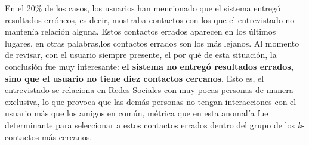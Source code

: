 En el 20\% de los casos, los usuarios han mencionado que el sistema entregó resultados erróneos, es decir, mostraba contactos con los que el entrevistado no mantenía relación alguna. Estos contactos errados aparecen en los últimos lugares, en otras palabras,los contactos errados son los más lejanos.
Al momento de revisar, con el usuario siempre presente, el por qué de esta situación, la conclusión fue muy interesante: \textbf{el sistema no entregó resultados errados, sino que el usuario no tiene diez contactos cercanos}. 
Esto es, el entrevistado se relaciona en Redes Sociales con muy pocas personas de manera exclusiva, lo que provoca que las demás personas no tengan interacciones con el usuario más que los amigos en común, métrica que en esta anomalía fue determinante para seleccionar a estos contactos errados dentro del grupo de los \textit{k}-contactos más cercanos. 

